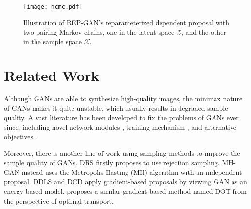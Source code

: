 \documentclass{article} %
\newcommand{\cX}{\mathcal{X}}
\newcommand{\cZ}{\mathcal{Z}}
\newcommand{\<}{\left\langle}
\renewcommand{\>}{\right\rangle}
\begin{document}


\begin{figure}[t]
\centering
\texttt{[image: mcmc.pdf]}
\caption{Illustration of REP-GAN's reparameterized dependent proposal with two pairing Markov chains, one in the latent space $\cZ$, and the other in the sample space $\cX$. }
\label{fig:pairing-chains}
\end{figure}


\section{Related Work}

Although GANs are able to synthesize high-quality images, the minimax nature of GANs makes it quite unstable, which usually results in degraded sample quality. 
A vast literature has been developed to fix the problems of GANs ever since, including novel network modules \citep{miyato2018spectral}, training mechanism \citep{metz2016unrolled}, and alternative objectives \citep{arjovsky2017wasserstein}.


Moreover, there is another line of work using sampling methods to improve the sample quality of GANs. DRS \citep{azadi2019discriminator} firstly proposes to use rejection sampling. MH-GAN \citep{turner2019metropolis} instead uses the Metropolis-Hasting (MH) algorithm with an independent proposal. DDLS \citep{che2020your} and DCD \citep{song2020discriminator} apply  gradient-based proposals by viewing GAN as an energy-based model. \cite{tanaka2019discriminator} proposes a similar gradient-based method named DOT from the perspective of optimal transport. 
\end{document}
